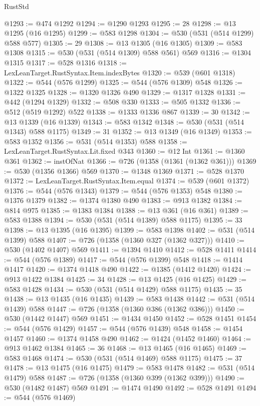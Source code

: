 \begin{lexlean}{RustStd}
\begin{coremodule}
@1293 := @474 @1292
@1294 := @1290 @1293
@1295 := 28
@1298 := @13 @1295 (@16 @1295)
@1299 := @583 @1298
@1304 := @530 (@531 (@514 @1299) @588 @577)
@1305 := 29
@1308 := @13 @1305 (@16 @1305)
@1309 := @583 @1308
@1315 := @530 (@531 (@514 @1309) @588 @561) @569
@1316 := @1304 @1315
@1317 := @528 @1316
@1318 := LexLeanTarget.RustSyntax.Item.indexBytes
@1320 := @539 (@601 @1318)
@1322 := @544 (@576 @1299)
@1325 := @544 (@576 @1309) @548
@1326 := @1322 @1325
@1328 := @1320 @1326 @490
@1329 := @1317 @1328
@1331 := @442 (@1294 @1329)
@1332 := @508 @330
@1333 := @505 @1332
@1336 := @512 (@519 @1292) @522
@1338 := @1333 @1336 @867
@1339 := 30
@1342 := @13 @1339 (@16 @1339)
@1343 := @583 @1342
@1348 := @530 (@531 (@514 @1343) @588 @1175)
@1349 := 31
@1352 := @13 @1349 (@16 @1349)
@1353 := @583 @1352
@1356 := @531 (@514 @1353) @588
@1358 := LexLeanTarget.RustSyntax.Lit.fixed @343
@1360 := @12 Int
@1361 := @1360 @361
@1362 := instOfNat
@1366 := @726 (@1358 (@1361 (@1362 @361)))
@1369 := @530 (@1356 @1366) @569
@1370 := @1348 @1369
@1371 := @528 @1370
@1372 := LexLeanTarget.RustSyntax.Item.equal
@1374 := @539 (@601 @1372)
@1376 := @544 (@576 @1343)
@1379 := @544 (@576 @1353) @548
@1380 := @1376 @1379
@1382 := @1374 @1380 @490
@1383 := @913 @1382
@1384 := @814 @975
@1385 := @1383 @1384
@1388 := @13 @361 (@16 @361)
@1389 := @583 @1388
@1394 := @530 (@531 (@514 @1389) @588 @1175)
@1395 := 33
@1398 := @13 @1395 (@16 @1395)
@1399 := @583 @1398
@1402 := @531 (@514 @1399) @588
@1407 := @726 (@1358 (@1360 @327 (@1362 @327)))
@1410 := @530 (@1402 @1407) @569
@1411 := @1394 @1410
@1412 := @528 @1411
@1414 := @544 (@576 @1389)
@1417 := @544 (@576 @1399) @548
@1418 := @1414 @1417
@1420 := @1374 @1418 @490
@1422 := @1385 (@1412 @1420)
@1424 := @913 @1422 @1384
@1425 := 34
@1428 := @13 @1425 (@16 @1425)
@1429 := @583 @1428
@1434 := @530 (@531 (@514 @1429) @588 @1175)
@1435 := 35
@1438 := @13 @1435 (@16 @1435)
@1439 := @583 @1438
@1442 := @531 (@514 @1439) @588
@1447 := @726 (@1358 (@1360 @386 (@1362 @386)))
@1450 := @530 (@1442 @1447) @569
@1451 := @1434 @1450
@1452 := @528 @1451
@1454 := @544 (@576 @1429)
@1457 := @544 (@576 @1439) @548
@1458 := @1454 @1457
@1460 := @1374 @1458 @490
@1462 := @1424 (@1452 @1460)
@1464 := @913 @1462 @1384
@1465 := 36
@1468 := @13 @1465 (@16 @1465)
@1469 := @583 @1468
@1474 := @530 (@531 (@514 @1469) @588 @1175)
@1475 := 37
@1478 := @13 @1475 (@16 @1475)
@1479 := @583 @1478
@1482 := @531 (@514 @1479) @588
@1487 := @726 (@1358 (@1360 @399 (@1362 @399)))
@1490 := @530 (@1482 @1487) @569
@1491 := @1474 @1490
@1492 := @528 @1491
@1494 := @544 (@576 @1469)

\end{coremodule}
\end{lexlean}

